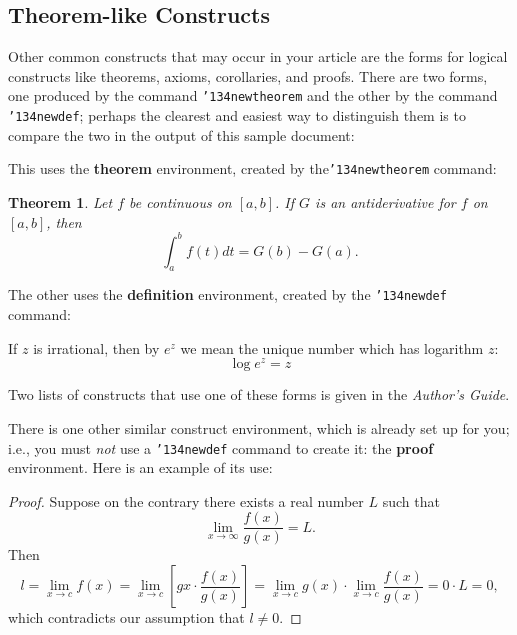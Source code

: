 \documentclass[twoside,letterpaper]{soups}
\begin{document}
\subsection{Theorem-like Constructs}
Other common constructs that may occur in your article are
the forms for logical constructs like theorems, axioms,
corollaries, and proofs.  There are
two forms, one produced by the
command \texttt{{\char'134}newtheorem} and the
other by the command \texttt{{\char'134}newdef}; perhaps
the clearest and easiest way to distinguish them is
to compare the two in the output of this sample document:

This uses the \textbf{theorem} environment, created by
the\linebreak\texttt{{\char'134}newtheorem} command:
\newtheorem{theorem}{Theorem}
\begin{theorem}
Let $f$ be continuous on $[a,b]$.  If $G$ is
an antiderivative for $f$ on $[a,b]$, then
\begin{displaymath}\int^b_af(t)dt = G(b) - G(a).\end{displaymath}
\end{theorem}

The other uses the \textbf{definition} environment, created
by the \texttt{{\char'134}newdef} command:
\begin{definition}
If $z$ is irrational, then by $e^z$ we mean the
unique number which has
logarithm $z$: \begin{displaymath}{\log e^z = z}\end{displaymath}
\end{definition}

Two lists of constructs that use one of these
forms is given in the
\textit{Author's  Guide}.
 
There is one other similar construct environment, which is
already set up
for you; i.e., you must \textit{not} use
a \texttt{{\char'134}newdef} command to
create it: the \textbf{proof} environment.  Here
is an example of its use:
\begin{proof}
Suppose on the contrary there exists a real number $L$ such that
\begin{displaymath}
\lim_{x\rightarrow\infty} \frac{f(x)}{g(x)} = L.
\end{displaymath}
Then
\begin{displaymath}
l=\lim_{x\rightarrow c} f(x)
= \lim_{x\rightarrow c}
\left[ g{x} \cdot \frac{f(x)}{g(x)} \right ]
= \lim_{x\rightarrow c} g(x) \cdot \lim_{x\rightarrow c}
\frac{f(x)}{g(x)} = 0\cdot L = 0,
\end{displaymath}
which contradicts our assumption that $l\neq 0$.
\end{proof}
\end{document}
